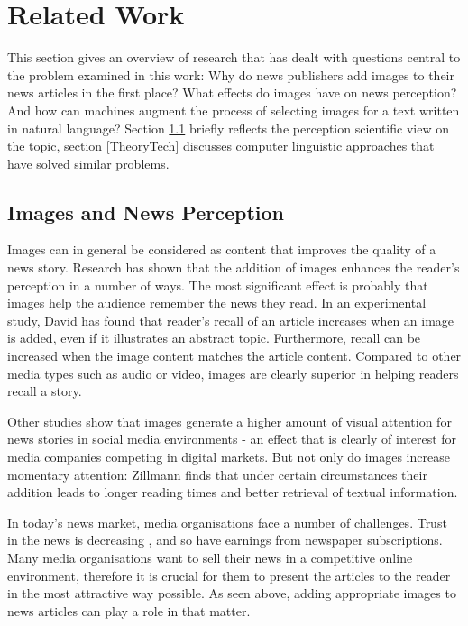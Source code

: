 \documentclass[11pt,a4paper,twoside]{article}
\begin{document}
\cleardoublepage

\section{Related Work}

This section gives an overview of research that has dealt with questions central to the problem examined in this work: Why do news publishers add images to their news articles in the first place? What effects do images have on news perception? And how can machines augment the process of selecting images for a text written in natural language? Section \ref{TheoryPerception} briefly reflects the perception scientific view on the topic, section \ref{TheoryTech} discusses computer linguistic approaches that have solved similar problems.

\subsection{Images and News Perception} \label{TheoryPerception}

Images can in general be considered as content that improves the quality of a news story. Research has shown that the addition of images enhances the reader's perception in a number of ways. The most significant effect is probably that images help the audience remember the news they read. In an experimental study, David has found that reader's recall of an article increases when an image is added, even if it illustrates an abstract topic. \cite[p. 197-199]{David1998NewsNews} Furthermore, recall can be increased when the image content matches the article content. \cite[p. 187-189]{David1998NewsNews} Compared to other media types such as audio or video, images are clearly superior in helping readers recall a story. \cite{Sundar2000MultimediaDownloads}

Other studies show that images generate a higher amount of visual attention for news stories in social media environments \cite{Keib2018PictureNews} - an effect that is clearly of interest for media companies competing in digital markets. But not only do images increase momentary attention: Zillmann finds that under certain circumstances their addition leads to longer reading times and better retrieval of textual information. \cite{Zillmann2001EffectsReports}

In today's news market, media organisations face a number of challenges. Trust in the news is decreasing \cite{Newman2017Reuters2017}, and so have earnings from newspaper subscriptions. Many media organisations want to sell their news in a competitive online environment, therefore it is crucial for them to present the articles to the reader in the most attractive way possible. As seen above, adding appropriate images to news articles can play a role in that matter.
\end{document}
